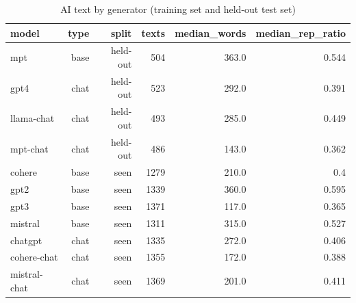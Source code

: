 \begin{table}[!t]
\centering
\caption{AI text by generator (training set and held-out test set)}
\label{tab:generators}
\footnotesize
\begin{tabular}{lrrrrr}
\toprule
\textbf{model} & \textbf{type} & \textbf{split} & \textbf{texts} & \textbf{median\_words} & \textbf{median\_rep\_ratio} \\
\midrule
mpt & base & held-out & 504 & 363.0 & 0.544 \\
gpt4 & chat & held-out & 523 & 292.0 & 0.391 \\
llama-chat & chat & held-out & 493 & 285.0 & 0.449 \\
mpt-chat & chat & held-out & 486 & 143.0 & 0.362 \\
cohere & base & seen & 1279 & 210.0 & 0.4 \\
gpt2 & base & seen & 1339 & 360.0 & 0.595 \\
gpt3 & base & seen & 1371 & 117.0 & 0.365 \\
mistral & base & seen & 1311 & 315.0 & 0.527 \\
chatgpt & chat & seen & 1335 & 272.0 & 0.406 \\
cohere-chat & chat & seen & 1355 & 172.0 & 0.388 \\
mistral-chat & chat & seen & 1369 & 201.0 & 0.411 \\
\bottomrule
\end{tabular}
\end{table}
